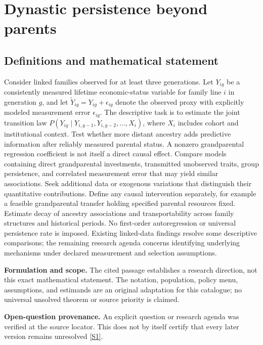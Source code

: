 \documentclass[11pt]{article}
\newcommand{\sref}[2]{\hyperlink{source:#1:#2}{[S#2]}}
\begin{document}
\section*{Dynastic persistence beyond parents}\label{30007646}
\subsection{Definitions and mathematical statement}
Consider linked families observed for at least three generations. Let \(Y_{ig}\) be a consistently measured lifetime economic-status variable for family line \(i\) in generation \(g\), and let \(\widetilde Y_{ig}=Y_{ig}+\epsilon_{ig}\) denote the observed proxy with explicitly modeled measurement error \(\epsilon_{ig}\). The descriptive task is to estimate the joint transition law \(P(Y_{ig}\mid Y_{i,g-1},Y_{i,g-2},\ldots,X_i)\), where \(X_i\) includes cohort and institutional context. Test whether more distant ancestry adds predictive information after reliably measured parental status. A nonzero grandparental regression coefficient is not itself a direct causal effect. Compare models containing direct grandparental investments, transmitted unobserved traits, group persistence, and correlated measurement error that may yield similar associations. Seek additional data or exogenous variations that distinguish their quantitative contributions. Define any causal intervention separately, for example a feasible grandparental transfer holding specified parental resources fixed. Estimate decay of ancestry associations and transportability across family structures and historical periods. No first-order autoregression or universal persistence rate is imposed. Existing linked-data findings resolve some descriptive comparisons; the remaining research agenda concerns identifying underlying mechanisms under declared measurement and selection assumptions.

\par\textbf{Formulation and scope.} The cited passage establishes a research direction, not this exact mathematical statement. The notation, population, policy menu, assumptions, and estimands are an original adaptation for this catalogue; no universal unsolved theorem or source priority is claimed.

\par\textbf{Open-question provenance.} An explicit question or research agenda was verified at the source locator. This does not by itself certify that every later version remains unresolved \sref{30007646}{1}.
\end{document}
